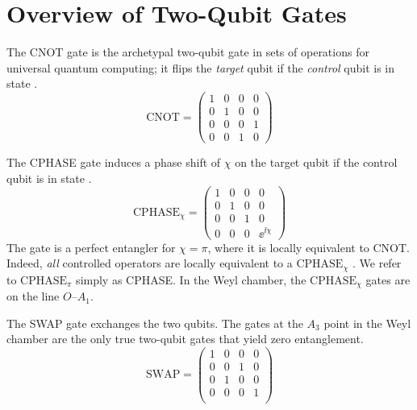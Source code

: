 \chapter{Overview of Two-Qubit Gates}
\label{AppendixGates}

  The CNOT gate is the archetypal two-qubit gate in sets of operations for
  universal quantum computing; it flips the \emph{target} qubit if
  the \emph{control} qubit is in state .
  \begin{equation}
  \text{CNOT} =
    \begin{pmatrix}
    1 & 0 & 0 & 0 \\
    0 & 1 & 0 & 0 \\
    0 & 0 & 0 & 1 \\
    0 & 0 & 1 & 0
    \end{pmatrix}
  \end{equation}

  The CPHASE gate induces a phase shift of $\chi$ on the target qubit if the
  control qubit is in state .
  \begin{equation}
  \text{CPHASE}_{\chi} =
    \begin{pmatrix}
    1 & 0 & 0 & 0 \\
    0 & 1 & 0 & 0 \\
    0 & 0 & 1 & 0 \\
    0 & 0 & 0 & \ee^{\ii \chi}
    \end{pmatrix}
  \end{equation}
  The gate is a perfect entangler for $\chi=\pi$, where it is locally
  equivalent to CNOT. Indeed, \emph{all} controlled operators are locally
  equivalent to a $\text{CPHASE}_{\chi}$ \cite{ZhangPRA03}. We refer to
  $\text{CPHASE}_{\pi}$ simply as CPHASE. In the Weyl chamber, the
  $\text{CPHASE}_{\chi}$ gates are on the line $O$--$A_1$.

  The SWAP gate exchanges the two qubits. The gates at the $A_3$ point in the
  Weyl chamber are the only true two-qubit gates that yield zero entanglement.
  \begin{equation}
  \text{SWAP} =
    \begin{pmatrix}
    1 & 0 & 0 & 0 \\
    0 & 0 & 1 & 0 \\
    0 & 1 & 0 & 0 \\
    0 & 0 & 0 & 1 \\
    \end{pmatrix}
  \end{equation}

